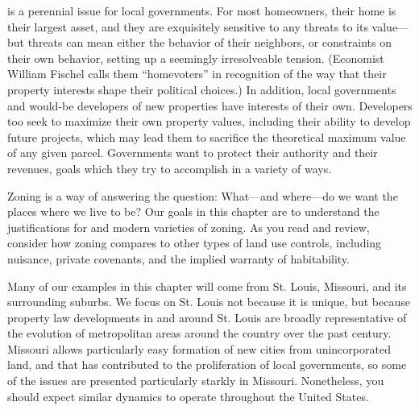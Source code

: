
 is a perennial issue for local governments. For most
homeowners, their
home is their largest asset, and they are exquisitely sensitive to any threats
to its value---but threats can mean either the behavior of their neighbors, or
constraints on their own behavior, setting up a seemingly irresolveable tension.
(Economist William Fischel calls them ``homevoters'' in recognition of the way
that their property interests shape their political choices.) In addition, local
governments and would-be developers of new properties have interests of their
own. Developers too seek to maximize their own property values, including their
ability to develop future projects, which may lead them to sacrifice the
theoretical maximum value of any given parcel. Governments want to protect their
authority and their revenues, goals which they try to accomplish in a variety of
ways.

Zoning is a way of answering the question: What---and where---do we want the
places where we live to be? Our goals in this chapter are to understand the
justifications for and modern varieties of zoning. As you read and review,
consider how zoning compares to other types of land use controls, including
nuisance, private covenants, and the implied warranty of habitability.

Many of our examples in this chapter will come from St. Louis, Missouri, and its
surrounding suburbs. We focus on St. Louis not because it is unique, but because
property law developments in and around St. Louis are broadly representative of
the evolution of metropolitan areas around the country over the past century.
Missouri allows particularly easy formation of new cities from unincorporated
land, and that has contributed to the proliferation of local governments, so
some of the issues are presented particularly starkly in Missouri. Nonetheless,
you should expect similar dynamics to operate throughout the United States.




